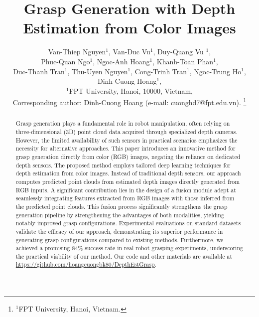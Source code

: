 \documentclass[usletter, 10pt, conference]{ieeeconf}
\title{Grasp Generation with Depth Estimation from Color Images}
\author
{Van-Thiep Nguyen$^{1}$, Van-Duc Vu$^{1}$, Duy-Quang Vu $^{1}$, \\ Phuc-Quan Ngo$^{1}$, Ngoc-Anh Hoang$^{1}$, Khanh-Toan Phan$^{1}$, \\ Duc-Thanh Tran$^{1}$, Thu-Uyen Nguyen$^{1}$, Cong-Trinh Tran$^{1}$, Ngoc-Trung Ho$^{1}$, Dinh-Cuong Hoang$^{1}$, \\ $^{1}$FPT University, Hanoi, 10000, Vietnam, \\ Corresponding author: Dinh-Cuong Hoang (e-mail: cuonghd7@fpt.edu.vn). %
\thanks{$^{1}$FPT University, Hanoi, Vietnam.}%
}
\begin{document}
\maketitle
\thispagestyle{empty}
\pagestyle{empty}


\begin{abstract}

Grasp generation plays a fundamental role in robot manipulation, often relying on three-dimensional (3D) point cloud data acquired through specialized depth cameras. However, the limited availability of such sensors in practical scenarios emphasizes the necessity for alternative approaches. This paper introduces an innovative method for grasp generation directly from color (RGB) images, negating the reliance on dedicated depth sensors. The proposed method employs tailored deep learning techniques for depth estimation from color images. Instead of traditional depth sensors, our approach computes predicted point clouds from estimated depth images directly generated from RGB inputs. A significant contribution lies in the design of a fusion module adept at seamlessly integrating features extracted from RGB images with those inferred from the predicted point clouds. This fusion process significantly strengthens the grasp generation pipeline by strengthening the advantages of both modalities, yielding notably improved grasp configurations. Experimental evaluations on standard datasets validate the efficacy of our approach, demonstrating its superior performance in generating grasp configurations compared to existing methods. Furthermore, we achieved a promising 84\% success rate in real robot grasping experiments, underscoring the practical viability of our method. Our code and other materials are available at \url{https://github.com/hoangcuongbk80/DepthEstGrasp}.

\end{abstract}


 
%

%

%

%


\end{document}
